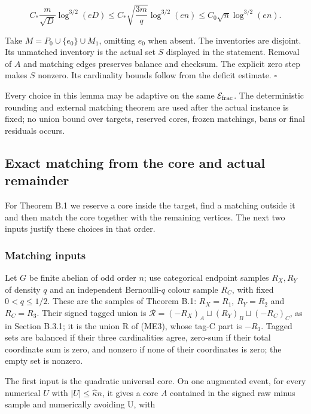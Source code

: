 \documentclass[11pt,a4paper]{article}
\begin{document}
\[
C_*\frac{m}{\sqrt D}\log^{3/2}(eD)
\le C_*\sqrt{\frac{3m}{q}}\log^{3/2}(en)
\le C_0\sqrt n\log^{3/2}(en).
\]

Take \(M=P_0\cup\{e_0\}\cup M_1\), omitting \(e_0\) when absent. The inventories are disjoint. Its unmatched inventory is the actual set \(S\) displayed in the statement. Removal of \(A\) and matching edges preserves balance and checksum. The explicit zero step makes \(S\) nonzero. Its cardinality bounds follow from the deficit estimate. \(\square\)

Every choice in this lemma may be adaptive on the same \(\mathcal E_{\rm frac}\). The deterministic rounding and external matching theorem are used after the actual instance is fixed; no union bound over targets, reserved cores, frozen matchings, bans or final residuals occurs.

\hypertarget{exact-matching-from-the-core-and-actual-remainder}{%
\subsection{Exact matching from the core and actual remainder}\label{exact-matching-from-the-core-and-actual-remainder}}

For Theorem B.1 we reserve a core inside the target, find a matching outside it and then match the core together with the remaining vertices. The next two inputs justify these choices in that order.

\hypertarget{matching-inputs}{%
\subsubsection{Matching inputs}\label{matching-inputs}}

Let \(G\) be finite abelian of odd order \(n\); use categorical endpoint samples \(R_X,R_Y\) of density \(q\) and an independent Bernoulli-\(q\) colour sample \(R_C\), with fixed \(0<q\le 1/2\). These are the samples of Theorem B.1: \(R_X=R_1\), \(R_Y=R_2\) and \(R_C=R_3\). Their signed tagged union is \(\mathcal R=(-R_X)_A\sqcup(R_Y)_B\sqcup(-R_C)_C\), as in Section B.3.1; it is the union R of (ME3), whose tag-C part is \(-R_3\). Tagged sets are balanced if their three cardinalities agree, zero-sum if their total coordinate sum is zero, and nonzero if none of their coordinates is zero; the empty set is nonzero.

The first input is the quadratic universal core. On one augmented event, for every numerical \(U\) with \(|U|\le \widehat{\kappa} n\), it gives a core \(A\) contained in the signed raw minus sample and numerically avoiding U, with
\end{document}

